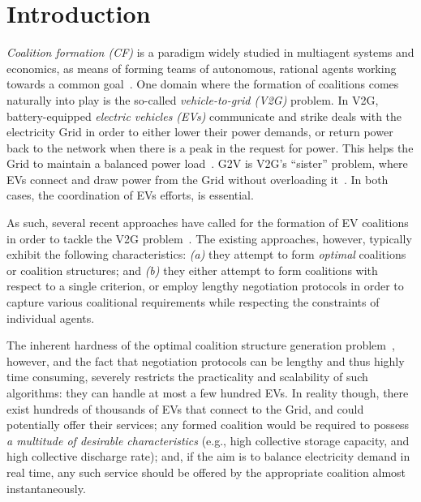 
\chapter{Introduction} %

\label{Chapter1} %
\label{sec:introduction}




{\em Coalition formation (CF)} is a paradigm widely studied in multiagent systems and economics, as means of forming teams of autonomous, rational agents working towards a common goal~\cite{chalkiadakis2011computational}.
One domain where the formation of coalitions comes naturally into play is the so-called {\em vehicle-to-grid (V2G)} problem. In V2G, battery-equipped {\em electric vehicles (EVs)} communicate and strike deals with the electricity Grid in order to either lower their power demands, or return power back to the network when there is a peak in the request for power. This helps the Grid to maintain 
a balanced power load~\cite{ramchurn2012putting}. 
G2V is V2G's ``sister'' problem, where EVs connect and draw power from the Grid without overloading it~\cite{valogianni2014effective}. 
In both cases, the coordination of EVs efforts, is essential.

As such, several recent approaches have called for the formation of EV coalitions in order to tackle the V2G problem~\cite{deORamos2014,kamboj2010exploring,kamboj2011deploying}.
The existing approaches, however, typically exhibit the following characteristics: {\em (a)} they attempt to form {\em optimal} coalitions or coalition structures; and {\em (b)} they either attempt to form coalitions with respect to a single criterion, or employ lengthy negotiation protocols in order to capture various coalitional requirements while respecting the constraints of individual agents. 

The inherent hardness of the optimal coalition structure generation problem~\cite{rahwan2009anytime}, however, and the fact that negotiation protocols can be lengthy and thus highly time consuming, severely restricts the practicality and scalability of such algorithms: they can handle at most a few hundred EVs. In reality though, there exist hundreds of thousands of EVs that connect to the Grid, and could potentially offer their services; any formed coalition would be required to possess {\em a multitude of desirable characteristics} (e.g., high collective storage capacity, and high collective discharge rate); and, if the aim is to balance electricity demand in real time, any such service should be offered by the appropriate coalition almost instantaneously.

